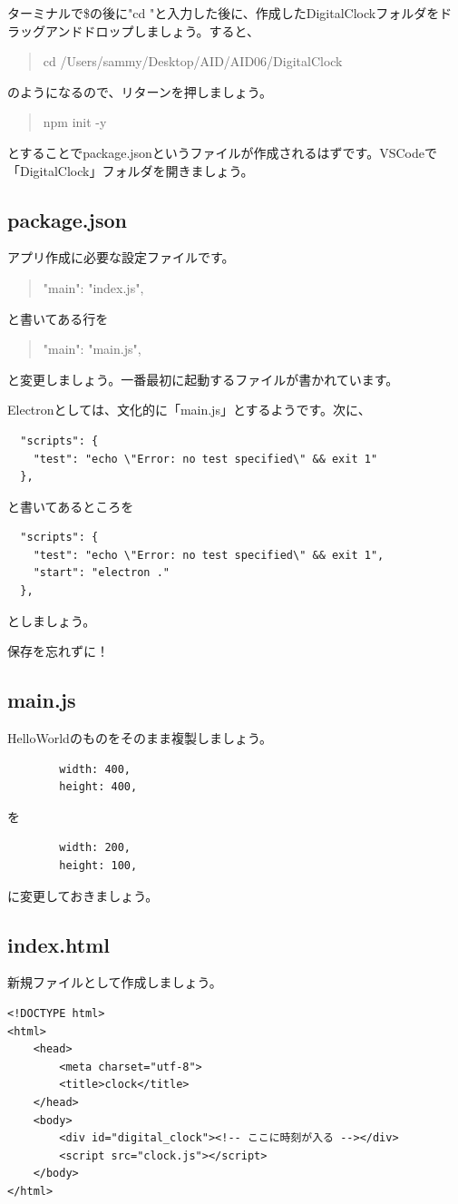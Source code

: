 \documentclass[mingoth,11pt,a4j,uplatex]{jsarticle}
\begin{document}
ターミナルで\$の後に"cd "と入力した後に、作成したDigitalClockフォルダをドラッグアンドドロップしましょう。すると、
\begin{quote}
cd /Users/sammy/Desktop/AID/AID06/DigitalClock 
\end{quote}
のようになるので、リターンを押しましょう。

\begin{quote}
npm init -y
\end{quote}
とすることでpackage.jsonというファイルが作成されるはずです。VSCodeで「DigitalClock」フォルダを開きましょう。

\subsection{package.json}
アプリ作成に必要な設定ファイルです。
\begin{quote}
  "main": "index.js",
\end{quote}
と書いてある行を
\begin{quote}
  "main": "main.js",
\end{quote}
と変更しましょう。一番最初に起動するファイルが書かれています。

Electronとしては、文化的に「main.js」とするようです。次に、

\begin{verbatim}
  "scripts": {
    "test": "echo \"Error: no test specified\" && exit 1"
  },
\end{verbatim}
と書いてあるところを
\begin{verbatim}
  "scripts": {
    "test": "echo \"Error: no test specified\" && exit 1",
    "start": "electron ."
  },
\end{verbatim}
としましょう。

保存を忘れずに！

\subsection{main.js}
HelloWorldのものをそのまま複製しましょう。

\begin{verbatim}
        width: 400,
        height: 400,
\end{verbatim}
を
\begin{verbatim}
        width: 200,
        height: 100,
\end{verbatim}
に変更しておきましょう。
\subsection{index.html}
新規ファイルとして作成しましょう。
\begin{lstlisting}[caption=DigitalClock：index.html]
<!DOCTYPE html>
<html>
    <head>
        <meta charset="utf-8">
        <title>clock</title>
    </head>
    <body>
        <div id="digital_clock"><!-- ここに時刻が入る --></div>
        <script src="clock.js"></script>
    </body>
</html>
\end{lstlisting}
\end{document}
